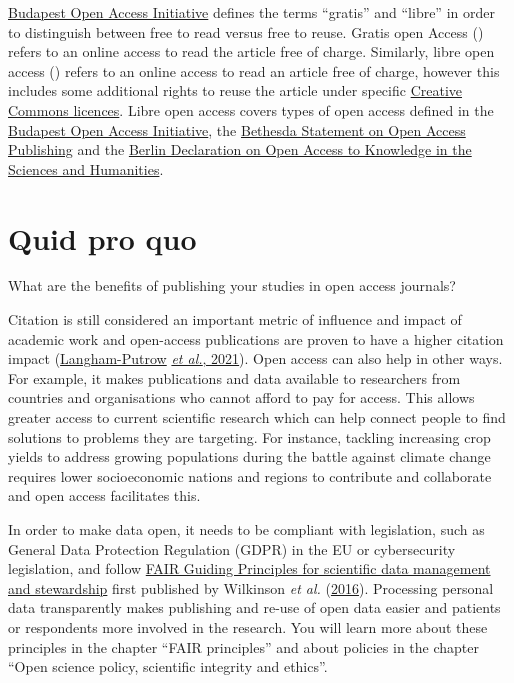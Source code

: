 \documentclass[
]{book}
\begin{document}
\href{https://www.budapestopenaccessinitiative.org/}{Budapest Open Access Initiative} defines the terms ``gratis'' and ``libre'' in order to distinguish between free to read versus free to reuse. Gratis open Access () refers to an online access to read the article free of charge. Similarly, libre open access () refers to an online access to read an article free of charge, however this includes some additional rights to reuse the article under specific \href{https://en.wikipedia.org/wiki/Creative_Commons_license}{Creative Commons licences}. Libre open access covers types of open access defined in the \href{https://en.wikipedia.org/wiki/Budapest_Open_Access_Initiative}{Budapest Open Access Initiative}, the \href{https://en.wikipedia.org/wiki/Bethesda_Statement_on_Open_Access_Publishing}{Bethesda Statement on Open Access Publishing} and the \href{https://en.wikipedia.org/wiki/Berlin_Declaration_on_Open_Access_to_Knowledge_in_the_Sciences_and_Humanities}{Berlin Declaration on Open Access to Knowledge in the Sciences and Humanities}.

\hypertarget{quid-pro-quo}{%
\section{Quid pro quo}\label{quid-pro-quo}}

What are the benefits of publishing your studies in open access journals?

Citation is still considered an important metric of influence and impact of academic work and open-access publications are proven to have a higher citation impact (\href{https://journals.plos.org/plosone/article?id=10.1371/journal.pone.0253129}{Langham-Putrow} \href{https://journals.plos.org/plosone/article?id=10.1371/journal.pone.0253129}{\emph{et al.}, 2021}). Open access can also help in other ways. For example, it makes publications and data available to researchers from countries and organisations who cannot afford to pay for access. This allows greater access to current scientific research which can help connect people to find solutions to problems they are targeting. For instance, tackling increasing crop yields to address growing populations during the battle against climate change requires lower socioeconomic nations and regions to contribute and collaborate and open access facilitates this.

In order to make data open, it needs to be compliant with legislation, such as General Data Protection Regulation (GDPR) in the EU or cybersecurity legislation, and follow \href{http://www.nature.com/articles/sdata201618}{FAIR Guiding Principles for scientific data management and stewardship} first published by Wilkinson \emph{et al.} (\href{https://www.nature.com/articles/sdata201618}{2016}). Processing personal data transparently makes publishing and re-use of open data easier and patients or respondents more involved in the research. You will learn more about these principles in the chapter ``FAIR principles'' and about policies in the chapter ``Open science policy, scientific integrity and ethics''.
\end{document}
